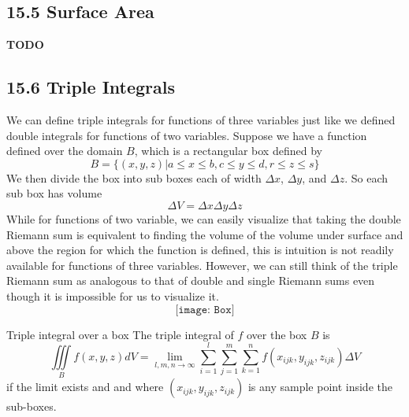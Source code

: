 \documentclass{article}
\begin{document}
	\subsection{15.5 Surface Area}
	\textbf{TODO}
	\subsection{15.6 Triple Integrals}
	We can define triple integrals for functions of three variables just like we
	defined double integrals for functions of two variables. Suppose we have a function
	defined over the domain $B$, which is a rectangular box defined by
	\[
		B= \{(x,y,z)| a \leq x\leq b, c \leq y \leq d, r \leq z \leq s \}
	\]
	We then divide the box into sub boxes each of width $\Delta x$, $\Delta y$,
	and $\Delta z$. So each sub box has volume
	\[
		\Delta V = \Delta x \Delta y \Delta z
	\]While for functions of two variable, we can easily visualize that taking the
	double Riemann sum is equivalent to finding the volume of the volume under surface
	and above the region for which the function is defined, this is intuition is
	not readily available for functions of three variables. However, we can still
	think of the triple Riemann sum as analogous to that of double and single
	Riemann sums even though it is impossible for us to visualize it.
	\[
		\texttt{[image: Box]}
	\]
	\begin{mybox}
		{Triple integral over a box} The triple integral of $f$ over the box $B$ is
		\[
			\iiint\limits_{B} f(x,y,z) dV = \lim_{l,m,n \to \infty}\sum_{i=1}^{l}\sum_{j=1}
			^{m}\sum_{k=1}^{n}f(x_{ijk},y_{ijk},z_{ijk}) \Delta V
		\]
		if the limit exists and and where $(x_{ijk},y_{ijk},z_{ijk})$ is any sample point
		inside the sub-boxes.
	\end{mybox}
\end{document}
